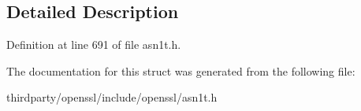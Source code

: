 \subsection{Detailed Description}


Definition at line 691 of file asn1t.\+h.



The documentation for this struct was generated from the following file\+:\begin{DoxyCompactItemize}
\item 
thirdparty/openssl/include/openssl/asn1t.\+h\end{DoxyCompactItemize}
